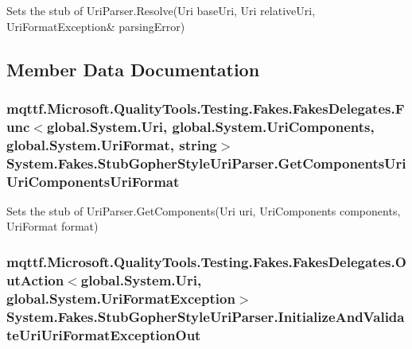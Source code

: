 Sets the stub of Uri\-Parser.\-Resolve(Uri base\-Uri, Uri relative\-Uri, Uri\-Format\-Exception\& parsing\-Error)



\subsection{Member Data Documentation}
\hypertarget{class_system_1_1_fakes_1_1_stub_gopher_style_uri_parser_a705100078c508f853ffab5d522932a93}{
\subsubsection[{Get\-Components\-Uri\-Uri\-Components\-Uri\-Format}]{\setlength{\rightskip}{0pt plus 5cm}mqttf.\-Microsoft.\-Quality\-Tools.\-Testing.\-Fakes.\-Fakes\-Delegates.\-Func$<$global.\-System.\-Uri, global.\-System.\-Uri\-Components, global.\-System.\-Uri\-Format, string$>$ System.\-Fakes.\-Stub\-Gopher\-Style\-Uri\-Parser.\-Get\-Components\-Uri\-Uri\-Components\-Uri\-Format}}\label{class_system_1_1_fakes_1_1_stub_gopher_style_uri_parser_a705100078c508f853ffab5d522932a93}


Sets the stub of Uri\-Parser.\-Get\-Components(\-Uri uri, Uri\-Components components, Uri\-Format format)

\hypertarget{class_system_1_1_fakes_1_1_stub_gopher_style_uri_parser_aaa8a51b010a8af97113215edfb55ae20}{
\subsubsection[{Initialize\-And\-Validate\-Uri\-Uri\-Format\-Exception\-Out}]{\setlength{\rightskip}{0pt plus 5cm}mqttf.\-Microsoft.\-Quality\-Tools.\-Testing.\-Fakes.\-Fakes\-Delegates.\-Out\-Action$<$global.\-System.\-Uri, global.\-System.\-Uri\-Format\-Exception$>$ System.\-Fakes.\-Stub\-Gopher\-Style\-Uri\-Parser.\-Initialize\-And\-Validate\-Uri\-Uri\-Format\-Exception\-Out}}\label{class_system_1_1_fakes_1_1_stub_gopher_style_uri_parser_aaa8a51b010a8af97113215edfb55ae20}


